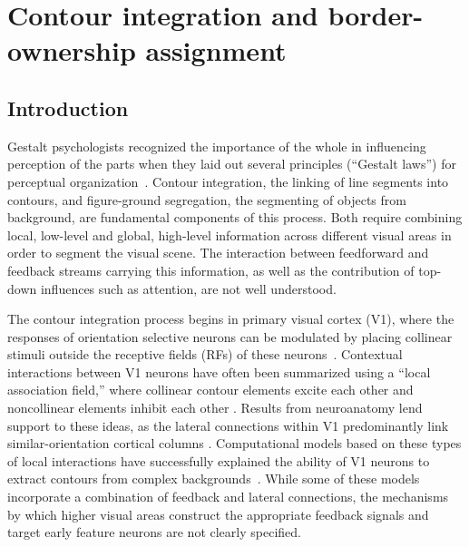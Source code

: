 \chapter{Contour integration and border-ownership assignment}
\label{sec:contour}

\section{Introduction}
\label{intro}

Gestalt psychologists recognized the importance of the whole in
influencing perception of the parts when they laid out several
principles (``Gestalt laws'') for perceptual
organization~\citep{Wertheimer23,Koffka35}. Contour integration, the
linking of line segments into contours, and figure-ground segregation,
the segmenting of objects from background, are fundamental components
of this process. Both require combining local, low-level and global,
high-level information across different visual areas in order to
segment the visual scene. The interaction between feedforward and
feedback streams carrying this information, as well as the
contribution of top-down influences such as attention, are not well
understood. 

The contour integration process begins in primary visual cortex (V1),
where the responses of orientation selective neurons can be modulated
by placing collinear stimuli outside the receptive fields (RFs) of
these neurons~\citep{Stemmler_etal95a,Polat_etal98}. Contextual
interactions between V1 neurons have often been summarized using a
``local association field,'' where collinear contour elements excite
each other and noncollinear elements inhibit each other
\citep{Ullman92, Field_etal93}.  Results from neuroanatomy lend
support to these ideas, as the lateral connections within V1
predominantly link similar-orientation cortical columns
\citep{Gilbert_Wiesel89,Bosking_etal97,
  Stettler_etal02}. Computational models based on these types of local
interactions have successfully explained the ability of V1 neurons to
extract contours from complex
backgrounds~\citep{Li98,Yen_Finkel98,Piech_etal13}. While some of
these models incorporate a combination of feedback and lateral
connections, the mechanisms by which higher visual areas construct the
appropriate feedback signals and target early feature neurons are not
clearly specified.  

